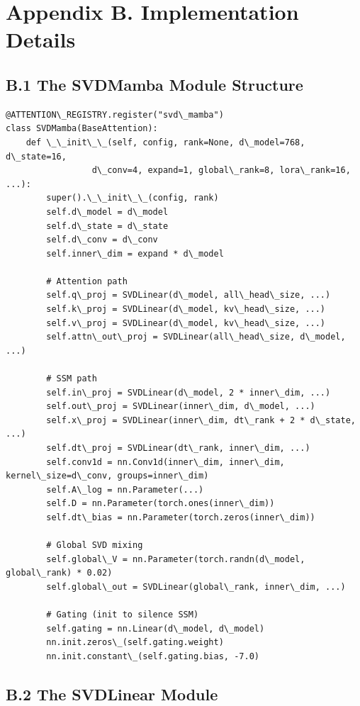 
\section{Appendix B. Implementation Details}

\subsection{B.1 The SVDMamba Module Structure}

\begin{lstlisting}
@ATTENTION\_REGISTRY.register("svd\_mamba")
class SVDMamba(BaseAttention):
    def \_\_init\_\_(self, config, rank=None, d\_model=768, d\_state=16,
                 d\_conv=4, expand=1, global\_rank=8, lora\_rank=16, ...):
        super().\_\_init\_\_(config, rank)
        self.d\_model = d\_model
        self.d\_state = d\_state
        self.d\_conv = d\_conv
        self.inner\_dim = expand * d\_model
        
        # Attention path
        self.q\_proj = SVDLinear(d\_model, all\_head\_size, ...)
        self.k\_proj = SVDLinear(d\_model, kv\_head\_size, ...)
        self.v\_proj = SVDLinear(d\_model, kv\_head\_size, ...)
        self.attn\_out\_proj = SVDLinear(all\_head\_size, d\_model, ...)
        
        # SSM path
        self.in\_proj = SVDLinear(d\_model, 2 * inner\_dim, ...)
        self.out\_proj = SVDLinear(inner\_dim, d\_model, ...)
        self.x\_proj = SVDLinear(inner\_dim, dt\_rank + 2 * d\_state, ...)
        self.dt\_proj = SVDLinear(dt\_rank, inner\_dim, ...)
        self.conv1d = nn.Conv1d(inner\_dim, inner\_dim, kernel\_size=d\_conv, groups=inner\_dim)
        self.A\_log = nn.Parameter(...)
        self.D = nn.Parameter(torch.ones(inner\_dim))
        self.dt\_bias = nn.Parameter(torch.zeros(inner\_dim))
        
        # Global SVD mixing
        self.global\_V = nn.Parameter(torch.randn(d\_model, global\_rank) * 0.02)
        self.global\_out = SVDLinear(global\_rank, inner\_dim, ...)
        
        # Gating (init to silence SSM)
        self.gating = nn.Linear(d\_model, d\_model)
        nn.init.zeros\_(self.gating.weight)
        nn.init.constant\_(self.gating.bias, -7.0)
\end{lstlisting}

\subsection{B.2 The SVDLinear Module}

